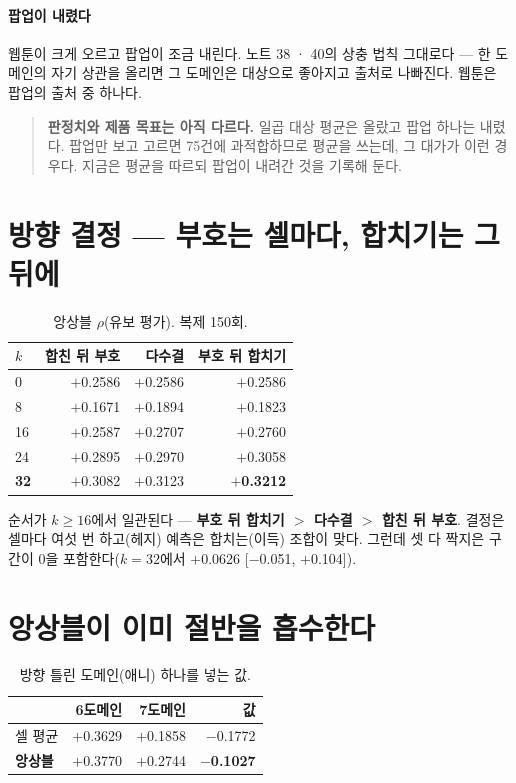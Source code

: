 \documentclass[10pt]{article}
\begin{document}
\paragraph{팝업이 내렸다}
웹툰이 크게 오르고 팝업이 조금 내린다. 노트 38 · 40의 상충 법칙 그대로다 ---
한 도메인의 자기 상관을 올리면 그 도메인은 대상으로 좋아지고 출처로 나빠진다.
웹툰은 팝업의 출처 중 하나다.

\begin{quote}\fontsize{9.5}{11.5}\selectfont
\textbf{판정치와 제품 목표는 아직 다르다.} 일곱 대상 평균은 올랐고 팝업 하나는
내렸다. 팝업만 보고 고르면 75건에 과적합하므로 평균을 쓰는데, 그 대가가 이런
경우다. 지금은 평균을 따르되 팝업이 내려간 것을 기록해 둔다.
\end{quote}

\section{방향 결정 --- 부호는 셀마다, 합치기는 그 뒤에}

\begin{table}[t]
\centering\tsize
\caption{앙상블 $\rho$(유보 평가). 복제 150회.}
\begin{tabular}{lrrr}
\toprule
$k$ & 합친 뒤 부호 & 다수결 & 부호 뒤 합치기 \\
\midrule
0 & $+$0.2586 & $+$0.2586 & $+$0.2586 \\
8 & $+$0.1671 & $+$0.1894 & $+$0.1823 \\
16 & $+$0.2587 & $+$0.2707 & $+$0.2760 \\
24 & $+$0.2895 & $+$0.2970 & $+$0.3058 \\
\textbf{32} & $+$0.3082 & $+$0.3123 & \textbf{$+$0.3212} \\
\bottomrule
\end{tabular}
\end{table}

순서가 $k\ge16$에서 일관된다 --- \textbf{부호 뒤 합치기 $>$ 다수결 $>$ 합친 뒤
부호}. 결정은 셀마다 여섯 번 하고(헤지) 예측은 합치는(이득) 조합이 맞다.
그런데 셋 다 짝지은 구간이 0을 포함한다($k{=}32$에서 $+$0.0626 {[}$-$0.051,
$+$0.104{]}).

\section{앙상블이 이미 절반을 흡수한다}

\begin{table}[t]
\centering\tsize
\caption{방향 틀린 도메인(애니) 하나를 넣는 값.}
\begin{tabular}{lrrr}
\toprule
& 6도메인 & 7도메인 & 값 \\
\midrule
셀 평균 & $+$0.3629 & $+$0.1858 & $-$0.1772 \\
\textbf{앙상블} & $+$0.3770 & $+$0.2744 & \textbf{$-$0.1027} \\
\bottomrule
\end{tabular}
\end{table}
\end{document}
